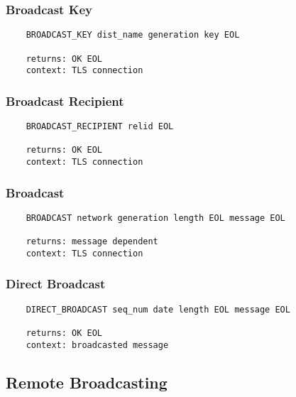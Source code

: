\documentclass[letterpaper,11pt,oneside]{article}
\begin{document}
\subsubsection{Broadcast Key}

\vspace{10pt}
\begin{verbatim}
    BROADCAST_KEY dist_name generation key EOL

    returns: OK EOL
    context: TLS connection
\end{verbatim}
\vspace{10pt}

\subsubsection{Broadcast Recipient}

\vspace{10pt}
\begin{verbatim}
    BROADCAST_RECIPIENT relid EOL

    returns: OK EOL
    context: TLS connection
\end{verbatim}
\vspace{10pt}

\subsubsection{Broadcast}

\vspace{10pt}
\begin{verbatim}
    BROADCAST network generation length EOL message EOL

    returns: message dependent
    context: TLS connection
\end{verbatim}
\vspace{10pt}

\subsubsection{Direct Broadcast}

\vspace{10pt}
\begin{verbatim}
    DIRECT_BROADCAST seq_num date length EOL message EOL

    returns: OK EOL
    context: broadcasted message
\end{verbatim}

\subsection{Remote Broadcasting}
\end{document}
